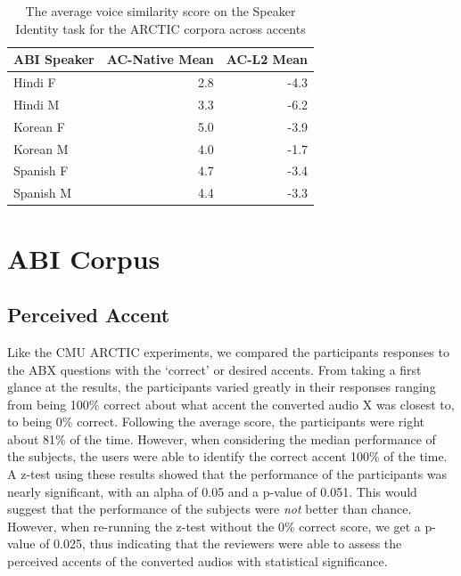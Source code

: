 \documentclass
[
    a4paper,
    twoside,
    12pt,
]
{report}
\begin{document}
\begin{table}[]
\centering
\begin{tabular}{|l|r|r|}
\hline
\textbf{ABI Speaker} & \textbf{AC-Native Mean} & \multicolumn{1}{l|}{\textbf{AC-L2 Mean}} \\ \hline
Hindi F                & 2.8                   & -4.3                                      \\ \hline
Hindi M                & 3.3                     & -6.2                                     \\ \hline
Korean F                & 5.0                    & -3.9                                     \\ \hline
Korean M                & 4.0                     & -1.7                                     \\ \hline
Spanish F                & 4.7                    & -3.4                                     \\ \hline
Spanish M                & 4.4                     & -3.3                                     \\ \hline
\end{tabular}
\caption{The average voice similarity score on the Speaker Identity task for the ARCTIC corpora across accents}
\label{table:arc-si-per-speaker}
\end{table}

\hypertarget{abi-corpus}{%
\section{ABI Corpus}\label{abi-corpus}}

\hypertarget{perceived-accent-1}{%
\subsection{Perceived Accent}\label{perceived-accent-1}}

Like the CMU ARCTIC experiments, we compared the participants responses
to the ABX questions with the `correct' or desired accents. From taking
a first glance at the results, the participants varied greatly in their
responses ranging from being 100\% correct about what accent the
converted audio X was closest to, to being 0\% correct. Following the
average score, the participants were right about 81\% of the time.
However, when considering the median performance of the subjects, the
users were able to identify the correct accent 100\% of the time. A
z-test using these results showed that the performance of the
participants was nearly significant, with an alpha of 0.05 and a p-value
of 0.051. This would suggest that the performance of the subjects were
\emph{not} better than chance. However, when re-running the z-test
without the 0\% correct score, we get a p-value of 0.025, thus
indicating that the reviewers were able to assess the perceived accents
of the converted audios with statistical significance.
\end{document}
